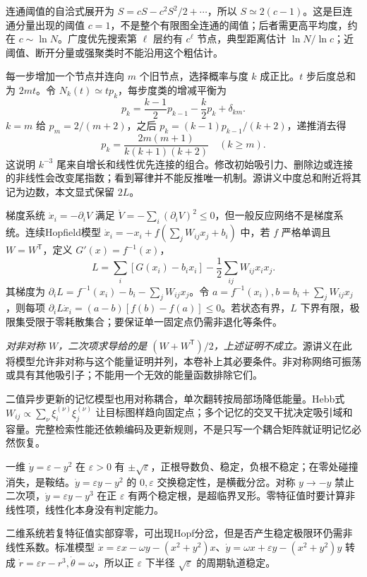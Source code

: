 连通阈值的自洽式展开为 $S=cS-c^2S^2/2+\cdots$，所以 $S\simeq2(c-1)$。这是巨连通分量出现的阈值 $c=1$，不是整个有限图全连通的阈值；后者需更高平均度，约在 $c\sim\ln N$。广度优先搜索第 $\ell$ 层约有 $c^\ell$ 节点，典型距离估计 $\ln N/\ln c$；近阈值、断开分量或强聚类时不能沿用这个粗估计。

每一步增加一个节点并连向 $m$ 个旧节点，选择概率与度 $k$ 成正比。$t$ 步后度总和为 $2mt$。令 $N_k(t)\simeq tp_k$，每步度类的增减平衡为
\[
p_k=\frac{k-1}{2}p_{k-1}-\frac k2p_k+\delta_{km}.
\]
$k=m$ 给 $p_m=2/(m+2)$，之后 $p_k=(k-1)p_{k-1}/(k+2)$，递推消去得
\[
p_k=\frac{2m(m+1)}{k(k+1)(k+2)}\quad(k\ge m).
\]
这说明 $k^{-3}$ 尾来自增长和线性优先连接的组合。修改初始吸引力、删除边或连接的非线性会改变尾指数；看到幂律并不能反推唯一机制。源讲义中度总和附近将其记为边数，本文显式保留 $2L$。

梯度系统 $\dot x_i=-\partial_iV$ 满足 $\dot V=-\sum_i(\partial_iV)^2\le0$，但一般反应网络不是梯度系统。连续Hopfield模型 $\dot x_i=-x_i+f(\sum_jW_{ij}x_j+b_i)$ 中，若 $f$ 严格单调且 $W=W^{\mathsf T}$，定义 $G'(x)=f^{-1}(x)$，
\[
L=\sum_i[G(x_i)-b_ix_i]-\frac12\sum_{ij}W_{ij}x_ix_j.
\]
其梯度为 $\partial_iL=f^{-1}(x_i)-b_i-\sum_jW_{ij}x_j$。令 $a=f^{-1}(x_i),b=b_i+\sum_jW_{ij}x_j$，则每项 $\partial_iL\dot x_i=(a-b)[f(b)-f(a)]\le0$。若状态有界，$L$ 下界有限，极限集受限于零耗散集合；要保证单一固定点仍需非退化等条件。

\emph{对非对称 $W$，二次项求导给的是 $(W+W^{\mathsf T})/2$，上述证明不成立。}源讲义在此将模型允许非对称与这个能量证明并列，本卷补上其必要条件。非对称网络可振荡或具有其他吸引子；不能用一个无效的能量函数排除它们。

二值异步更新的记忆模型也用对称耦合，单次翻转按局部场降低能量。Hebb式 $W_{ij}\propto\sum_\nu\xi_i^{(\nu)}\xi_j^{(\nu)}$ 让目标图样趋向固定点；多个记忆的交叉干扰决定吸引域和容量。完整检索性能还依赖编码及更新规则，不是只写一个耦合矩阵就证明记忆必然恢复。

一维 $\dot y=\varepsilon-y^2$ 在 $\varepsilon>0$ 有 $\pm\sqrt\varepsilon$，正根导数负、稳定，负根不稳定；在零处碰撞消失，是鞍结。$\dot y=\varepsilon y-y^2$ 的 $0,\varepsilon$ 交换稳定性，是横截分岔。对称 $y\to-y$ 禁止二次项，$\dot y=\varepsilon y-y^3$ 在正 $\varepsilon$ 有两个稳定根，是超临界叉形。零特征值时要计算非线性项，线性化本身没有判定能力。

二维系统若复特征值实部穿零，可出现Hopf分岔，但是否产生稳定极限环仍需非线性系数。标准模型 $\dot x=\varepsilon x-\omega y-(x^2+y^2)x$、$\dot y=\omega x+\varepsilon y-(x^2+y^2)y$ 转成 $\dot r=\varepsilon r-r^3,\dot\theta=\omega$，所以正 $\varepsilon$ 下半径 $\sqrt\varepsilon$ 的周期轨道稳定。


